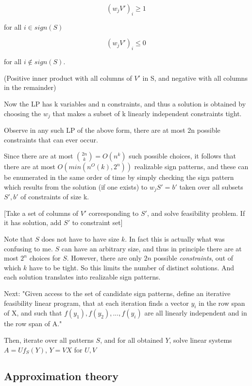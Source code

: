 \documentclass[english]{article}
\begin{document}
$$(w_j V')_i \ge 1$$ 

for all $i \in sign(S)$

$$(w_j V')_i \le 0$$ 

for all $i \notin sign(S)$.


(Positive inner product with all columns of $V'$ in S, and negative with all columns in the remainder)


Now the LP has k variables and n constraints, and thus a
solution is obtained by choosing the $w_j$ that makes a subset of k linearly independent constraints
tight.  

Observe in any such LP of the above form, there are at most 2n possible constraints that
can ever occur. 

Since there are at most $\binom{2n}{k}= O(n^k)$ such possible choices, it follows that there are at most $O(min(n^O(k),2^n))$ realizable sign patterns, and these can be enumerated in the same order of time by simply checking the sign pattern which results from the solution (if one
exists) to $w_j S' =b'$ taken over all subsets $S',b'$ of constraints of size k.

[Take a set of columns of $V'$ corresponding to $S'$, and solve feasibility problem. If it has solution, add $S'$ to constraint set]

Note that $S$ does not have to have size $k$. In fact this is actually what was confusing to me. $S$ can have an arbitrary size, and thus in principle there are at most $2^n$ choices for $S$. However, there are only $2n$ possible \emph{constraints}, out of which $k$ have to be tight. So this limits the number of distinct solutions. And each solution translates into realizable sign patterns.


Next: "Given access to the set of candidate sign patterns, define an iterative feasibility linear program, that at each iteration finds a vector $y_i$ in the row span of X, and such that $f(y_1 ),f(y_2 ),...,f(y_i)$ are all linearly independent and in the row span of A."

Then, iterate over all patterns $S$, and for all obtained $Y$, solve linear systems $A=Uf_S(Y)$, $Y=VX$ for $U,V$





\eenum 

\subsection{Approximation theory}
\end{document}
